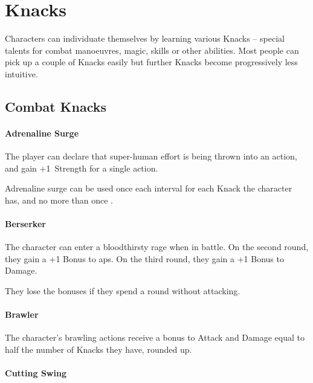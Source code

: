 \chapter[Hall of Knacks]{Knacks}
\label{knacks}

\noindent
Characters can individuate themselves by learning various Knacks -- special talents for combat manoeuvres, magic, skills or other abilities.
Most people can pick up a couple of Knacks easily but further Knacks become progressively less intuitive.

\section{Combat Knacks}

\begin{multicols}{2}

\subsubsection{Adrenaline Surge}
\label{adrenalinesurge}

The player can declare that super-human effort is being thrown into an action, and gain +1~Strength for a single action.

Adrenaline surge can be used once each \gls{interval} for each Knack the character has, and no more than once .

\subsubsection{Berserker}

The character can enter a bloodthirsty rage when in battle.
On the second round, they gain a +1 Bonus to \glspl{ap}.
On the third round, they gain a +1 Bonus to Damage.

They lose the bonuses if they spend a round without attacking.

\subsubsection{Brawler}

The character's brawling actions receive a bonus to Attack and Damage equal to half the number of Knacks they have, rounded up.

\subsubsection{Cutting Swing}


\end{multicols}
